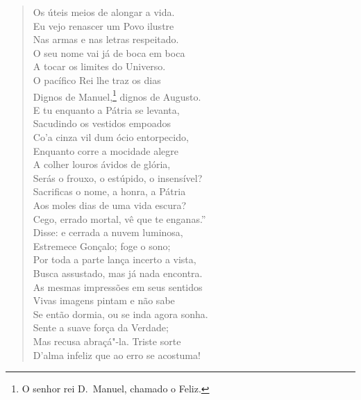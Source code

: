 \begin{verse}
Os úteis meios de alongar a vida.\\
Eu vejo renascer um Povo ilustre\\
Nas armas e nas letras respeitado.\\
O seu nome vai já de boca em boca\\
A tocar os limites do Universo.\\
O pacífico Rei lhe traz os dias\\
Dignos de Manuel,\footnote{ O senhor rei D.~Manuel, chamado o Feliz.}
dignos de Augusto.\\			\index{\Aug}
E tu enquanto a Pátria se levanta,\\
Sacudindo os vestidos empoados\\
Co'a cinza vil dum ócio entorpecido,\\
Enquanto corre a mocidade alegre\\
A colher louros ávidos de glória,\\			\index{\Lour}
Serás o frouxo, o estúpido, o insensível?\\
Sacrificas o nome, a honra, a Pátria\\
Aos moles dias de uma vida escura?\\
Cego, errado mortal, vê que te enganas.''\\
Disse: e cerrada a nuvem luminosa,\\
Estremece Gonçalo; foge o sono;\\
Por toda a parte lança incerto a vista,\\
Busca assustado, mas já nada encontra.\\
As mesmas impressões em seus sentidos\\
Vivas imagens pintam e não sabe\\
Se então dormia, ou se inda agora sonha.\\
Sente a suave força da Verdade;\\
Mas recusa abraçá"-la. Triste sorte\\
D'alma infeliz que ao erro se acostuma! \\[10pt]



\end{verse}

